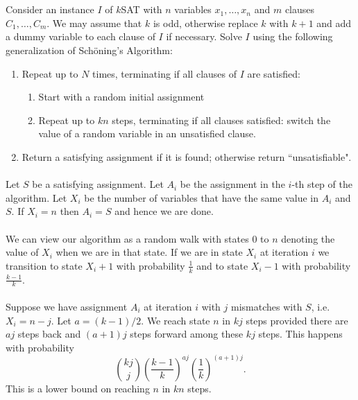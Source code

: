 \documentclass[letterpaper,12pt,oneside,onecolumn]{article}
\begin{document}
	\section{}
	\paragraph{}
	Consider an instance $I$ of $k$SAT with $n$ variables $x_1,\dots,x_n$ and $m$ clauses $C_1, \dots, C_m$. We may assume that $k$ is odd, otherwise replace $k$ with $k+1$ and add a dummy variable to each clause of $I$ if necessary. Solve $I$ using the following generalization of Sch\"oning's Algorithm:
	\begin{enumerate}
		\item Repeat up to $N$ times, terminating if all clauses of $I$ are satisfied:
		\begin{enumerate}
			\item Start with a random initial assignment
			\item Repeat up to $kn$ steps, terminating if all clauses satisfied: switch the value of a random variable in an unsatisfied clause.
		\end{enumerate}
		\item Return a satisfying assignment if it is found; otherwise return ``unsatisfiable".
	\end{enumerate}
	\paragraph{}
	Let $S$ be a satisfying assignment. Let $A_i$ be the assignment in the $i$-th step of the algorithm. Let $X_i$ be the number of variables that have the same value in $A_i$ and $S$. If $X_i = n$ then $A_i = S$ and hence we are done.
	\paragraph{}
	We can view our algorithm as a random walk with states $0$ to $n$ denoting the value of $X_i$ when we are in that state. If we are in state $X_i$ at iteration $i$ we transition to state $X_i+1$ with probability $\frac{1}{k}$ and to state $X_i-1$ with probability $\frac{k-1}{k}$.
	\paragraph{}
	Suppose we have assignment $A_i$ at iteration $i$ with $j$ mismatches with $S$, i.e. $X_i = n-j$. Let $a = (k-1)/2$. We reach state $n$ in $kj$ steps provided there are $aj$ steps back and $(a+1)j$ steps forward among these $kj$ steps. This happens with probability
	$${kj\choose j}(\frac{k-1}{k})^{aj}(\frac{1}{k})^{(a+1)j}.$$
	This is a lower bound on reaching $n$ in $kn$ steps.
\end{document}
